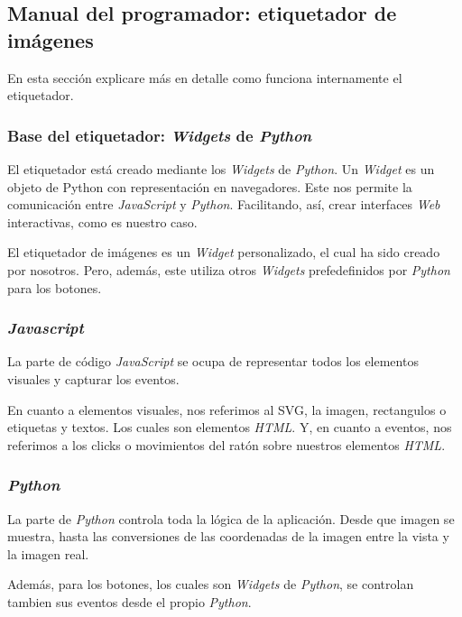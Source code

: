 \subsection{Manual del programador: etiquetador de imágenes}

En esta sección explicare más en detalle como funciona internamente el etiquetador.

\subsubsection{Base del etiquetador: \textit{Widgets} de \textit{Python}}

El etiquetador está creado mediante los \textit{Widgets} de \textit{Python}. Un \textit{Widget} es un objeto de Python con representación en navegadores. Este nos permite la comunicación entre \textit{JavaScript} y \textit{Python}. Facilitando, así, crear interfaces \textit{Web} interactivas, como es nuestro caso\cite{ipywidgets:whataarewidgets}.

El etiquetador de imágenes es un \textit{Widget} personalizado, el cual ha sido creado por nosotros. Pero, además, este utiliza otros \textit{Widgets} prefedefinidos por \textit{Python} para los botones.

\subsubsection{\textit{Javascript}}

La parte de código \textit{JavaScript} se ocupa de representar todos los elementos visuales y capturar los eventos.

En cuanto a elementos visuales, nos referimos al SVG, la imagen, rectangulos o etiquetas y textos. Los cuales son elementos \textit{HTML}. Y, en cuanto a eventos, nos referimos a los clicks o movimientos del ratón sobre nuestros elementos \textit{HTML}.

\subsubsection{\textit{Python}}

La parte de \textit{Python} controla toda la lógica de la aplicación. Desde que imagen se muestra, hasta las conversiones de las coordenadas de la imagen entre la vista y la imagen real.

Además, para los botones, los cuales son \textit{Widgets} de \textit{Python}, se controlan tambien sus eventos desde el propio \textit{Python}.

